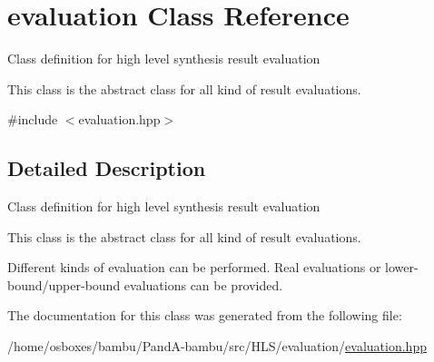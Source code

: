 \hypertarget{classevaluation}{}\section{evaluation Class Reference}
\label{classevaluation}


Class definition for high level synthesis result evaluation

This class is the abstract class for all kind of result evaluations.  




{\ttfamily \#include $<$evaluation.\+hpp$>$}



\subsection{Detailed Description}
Class definition for high level synthesis result evaluation

This class is the abstract class for all kind of result evaluations. 

Different kinds of evaluation can be performed. Real evaluations or lower-\/bound/upper-\/bound evaluations can be provided. 

The documentation for this class was generated from the following file\+:\begin{DoxyCompactItemize}
\item 
/home/osboxes/bambu/\+Pand\+A-\/bambu/src/\+H\+L\+S/evaluation/\hyperlink{evaluation_8hpp}{evaluation.\+hpp}\end{DoxyCompactItemize}
